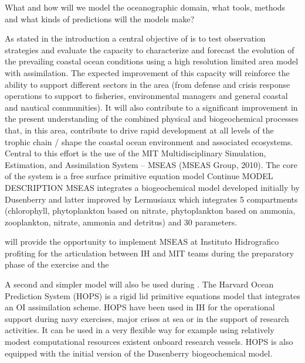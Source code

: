 What and how will we model the oceanographic domain, what tools, methods and what kinds of predictions will the models make?

As stated in the introduction a central objective of \proj is to test
observation strategies and evaluate the capacity to characterize and
forecast the evolution of the prevailing coastal ocean conditions using
a high resolution limited area model with assimilation. The expected
improvement of this capacity will reinforce the ability to support
different sectors in the area (from defense and crisis response
operations to support to fisheries, environmental managers and general
coastal and nautical communities). It will also contribute to a
significant improvement in the present understanding of the combined
physical and biogeochemical processes that, in this area, contribute to
drive rapid development at all levels of the trophic chain / shape the
coastal ocean environment and associated ecosystems.  Central to this
effort is the use of the MIT Multidisciplinary Simulation, Estimation,
and Assimilation System – MSEAS (MSEAS Group, 2010). The core of the
system is a free surface primitive equation model Continue MODEL
DESCRIPTION MSEAS integrates a biogeochemical model developed initially
by Dusenberry and latter improved by Lermusiaux which integrates 5
compartments (chlorophyll, phytoplankton based on nitrate, phytoplankton
based on ammonia, zooplankton, nitrate, ammonia and detritus) and 30
parameters.

\proj will provide the opportunity to implement MSEAS at Instituto
Hidrografico profiting for the articulation between IH and MIT teams
during the preparatory phase of the exercise and the

A second and simpler model will also be used during \proje.  The Harvard
Ocean Prediction System (HOPS) is a rigid lid primitive equations model
that integrates an OI assimilation scheme. HOPS have been used in IH for
the operational support during navy exercises, major crises at sea or in
the support of research activities. It can be used in a very flexible
way for example using relatively modest computational resources existent
onboard research vessels. HOPS is also equipped with the initial version
of the Dusenberry biogeochemical model.

